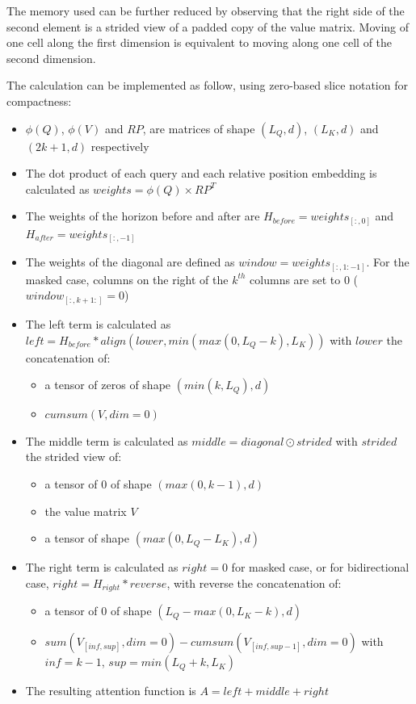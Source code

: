 The memory used can be further reduced by observing that the right side
of the second element is a strided view of a padded copy of the value
matrix. Moving of one cell along the first dimension is equivalent to
moving along one cell of the second dimension.

The calculation can be implemented as follow, using zero-based slice
notation for compactness:

\begin{itemize}
\tightlist
\item
  \(\phi(Q)\), \(\phi(V)\) and \(RP\), are matrices of shape
  \((L_Q, d)\), \((L_K, d)\) and \((2k+1, d)\) respectively
\item
  The dot product of each query and each relative position embedding is
  calculated as \(weights = \phi(Q) \times RP^T\)
\item
  The weights of the horizon before and after are
  \(H_{before} = weights_{[:, 0]}\) and
  \(H_{after} = weights_{[:, -1]}\)
\item
  The weights of the diagonal are defined as
  \(window = weights_{[:,1:-1]}\). For the masked case, columns on the
  right of the \(k^{th}\) columns are set to 0
  (\(window_{[:, k+1:]} = 0\))
\item
  The left term is calculated as
  \(left = H_{before} * align(lower, min(max(0, L_Q-k), L_K))\) with
  \(lower\) the concatenation of:

  \begin{itemize}
  \tightlist
  \item
    a tensor of zeros of shape \(\left(min(k, L_Q), d\right)\)
  \item
    \(cumsum(V, dim=0)\)
  \end{itemize}
\item
  The middle term is calculated as \(middle = diagonal \odot strided\)
  with \(strided\) the strided view of:

  \begin{itemize}
  \tightlist
  \item
    a tensor of 0 of shape \((max(0, k-1), d)\)
  \item
    the value matrix \(V\)
  \item
    a tensor of shape \((max(0, L_Q-L_K), d)\)
  \end{itemize}
\item
  The right term is calculated as \(right = 0\) for masked case, or for
  bidirectional case, \(right = H_{right} * reverse\), with reverse the
  concatenation of:

  \begin{itemize}
  \tightlist
  \item
    a tensor of 0 of shape \((L_Q-max(0, L_K-k), d)\)
  \item
    \(sum(V_{[inf, sup]}, dim=0) - cumsum(V_{[inf, sup-1]}, dim=0)\)
    with \(inf = k-1\), \(sup = min(L_Q+k, L_K)\)
  \end{itemize}
\item
  The resulting attention function is \(A = left + middle + right\)
\end{itemize}

